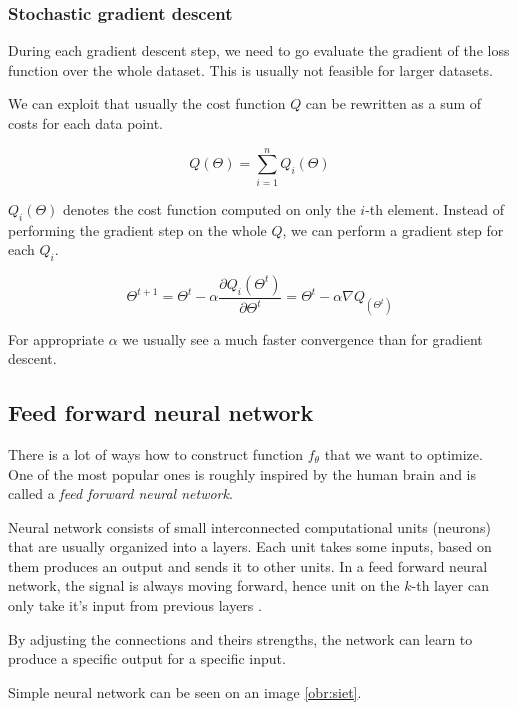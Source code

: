         
        \subsubsection{Stochastic gradient descent}
        
        During each gradient descent step, we need to go evaluate the gradient of the loss function over the whole dataset.
        This is usually not feasible for larger datasets. 
        
        We can exploit that usually the cost function $Q$ can be rewritten as a sum of costs for each data point.
        
        $$Q(\Theta) = \sum_{i=1}^n Q_i(\Theta)$$
        
        $Q_i(\Theta)$ denotes the cost function computed on only the $i$-th element. 
        Instead of performing the gradient step on the whole $Q$, 
        we can perform a gradient step for each $Q_i$. 

        $$\Theta^{t+1} = \Theta^t - \alpha \frac{\partial Q_i(\Theta^t)}{\partial \Theta^t} = \Theta^t - \alpha \nabla Q_(\Theta^t)$$
        
        For appropriate $\alpha$ we usually see a much faster convergence than for gradient descent.
        
        
        \subsection{Feed forward neural network}
        There is a lot of ways how to construct function $f_\theta$ that we want to optimize. 
        One of the most popular ones is roughly inspired by the human brain and is called a \textit{feed forward neural network}.
        
        Neural network consists of small interconnected computational units (neurons) that are usually organized into a layers.
        Each unit takes some inputs, based on them produces an output and sends it to other units. 
        In a feed forward neural network, the signal is always moving forward,
        hence unit on the $k$-th layer can only take it's input from previous layers \cite{Goodfellow-et-al-2016}.
        
        By adjusting the connections and theirs strengths, the network can learn to produce a specific output for a specific input.
        
        Simple neural network can be seen on an image \ref{obr:siet}.
        
